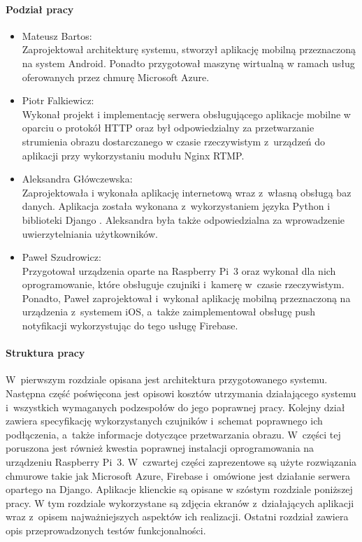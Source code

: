\paragraph{Podział pracy}
\begin{itemize}
\item Mateusz Bartos: \\
Zaprojektował architekturę systemu, stworzył aplikację mobilną przeznaczoną na system Android. Ponadto przygotował maszynę wirtualną w ramach usług oferowanych przez chmurę Microsoft Azure.
\item Piotr Falkiewicz: \\
Wykonał projekt i implementację serwera obsługującego aplikacje mobilne w oparciu o protokół HTTP oraz był odpowiedzialny za przetwarzanie strumienia obrazu dostarczanego w czasie rzeczywistym z~urządzeń do aplikacji przy wykorzystaniu modułu Nginx RTMP.
\item Aleksandra Główczewska: \\
Zaprojektowała i wykonała aplikację internetową wraz z~własną obsługą baz danych. Aplikacja została wykonana z~wykorzystaniem języka Python i biblioteki Django \cite{djangoREST}. Aleksandra była także odpowiedzialna za wprowadzenie uwierzytelniania użytkowników.
\item Paweł Szudrowicz: \\
Przygotował urządzenia oparte na Raspberry Pi~3 oraz wykonał dla nich oprogramowanie, które obsługuje czujniki i~kamerę w~czasie rzeczywistym. Ponadto, Paweł zaprojektował i~wykonał aplikację mobilną przeznaczoną na urządzenia z~systemem iOS, a~także zaimplementował obsługę push notyfikacji wykorzystując do tego usługę Firebase.
\end{itemize}

\paragraph{Struktura pracy}
W~pierwszym rozdziale opisana jest architektura przygotowanego systemu. Następna część poświęcona jest opisowi kosztów utrzymania działającego systemu i~wszystkich wymaganych podzespołów do jego poprawnej pracy. Kolejny dział zawiera specyfikację wykorzystanych czujników i~schemat poprawnego ich podłączenia, a~także informacje dotyczące przetwarzania obrazu. W~części tej poruszona jest również kwestia poprawnej instalacji oprogramowania na urządzeniu Raspberry Pi~3.  W~czwartej części zaprezentowe są użyte rozwiązania chmurowe takie jak Microsoft Azure, Firebase i~omówione jest działanie serwera opartego na Django. Aplikacje klienckie są opisane w szóstym rozdziale poniższej pracy. W tym rozdziale wykorzystane są zdjęcia ekranów z~działających aplikacji wraz z~opisem najważniejszych aspektów ich realizacji. Ostatni rozdział zawiera opis przeprowadzonych testów funkcjonalności.
